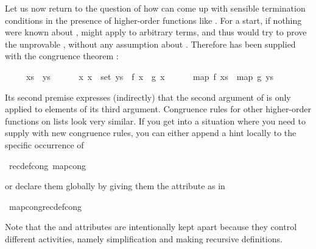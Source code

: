 \begin{isabellebody}
\begin{isamarkuptext}
Let us now return to the question of how  can come up with
sensible termination conditions in the presence of higher-order functions
like . For a start, if nothing were known about ,
 might apply  to arbitrary terms, and thus
 would try to prove the unprovable , without any assumption about .  Therefore
 has been supplied with the congruence theorem
:
\begin{isabelle}%
\ \ \ \ \ xs\ {\isacharequal}\ ys\ {\isasymLongrightarrow}\isanewline
\ \ \ \ \ {\isacharparenleft}{\isasymAnd}x{\isachardot}\ x\ {\isasymin}\ set\ ys\ {\isasymLongrightarrow}\ f\ x\ {\isacharequal}\ g\ x{\isacharparenright}\ {\isasymLongrightarrow}\isanewline
\ \ \ \ \ map\ f\ xs\ {\isacharequal}\ map\ g\ ys%
\end{isabelle}
Its second premise expresses (indirectly) that the second argument of
 is only applied to elements of its third argument. Congruence
rules for other higher-order functions on lists look very similar. If you get
into a situation where you need to supply  with new
congruence rules, you can either append a hint locally
to the specific occurrence of %
\end{isamarkuptext}%
{\isacharparenleft}\ recdef{\isacharunderscore}cong{\isacharcolon}\ map{\isacharunderscore}cong{\isacharparenright}%
\begin{isamarkuptext}%
\noindent
or declare them globally
by giving them the  attribute as in%
\end{isamarkuptext}%
\ map{\isacharunderscore}cong{\isacharbrackleft}recdef{\isacharunderscore}cong{\isacharbrackright}%
\begin{isamarkuptext}%
Note that the  and  attributes are
intentionally kept apart because they control different activities, namely
simplification and making recursive definitions.
\end{isamarkuptext}%
\end{isabellebody}%
